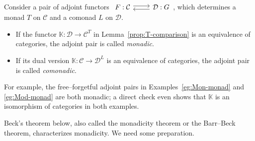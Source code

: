 \begin{definition}\label{def:monadic}
	Consider a pair of adjoint functors
	$\begin{tikzcd}
		F: \mathcal{C} \arrow[shift left, r] & \mathcal{D}: G \arrow[shift left, l]
	\end{tikzcd}$,
	which determines a monad $T$ on $\mathcal{C}$ and a comonad $L$ on
	$\mathcal{D}$.
	\begin{itemize}
		\item If the functor $\mathbb{K}:\mathcal{D}\to\mathcal{C}^T$ in
		Lemma~\ref{prop:T-comparison} is an equivalence of categories, the
		adjoint pair is called \emph{monadic}.
		\item If its dual version
		$\mathbb{K}:\mathcal{C}\to\mathcal{D}^L$ is an equivalence of
		categories, the adjoint pair is called \emph{comonadic}.
	\end{itemize}
\end{definition}

For example, the free--forgetful adjoint pairs in
Examples~\ref{eg:Mon-monad} and \ref{eg:Mod-monad} are both monadic; a direct
check even shows that $\mathbb{K}$ is an isomorphism of categories in both
examples.

Beck's theorem below, also called the monadicity theorem or the Barr--Beck
theorem, characterizes monadicity. We need some preparation.

